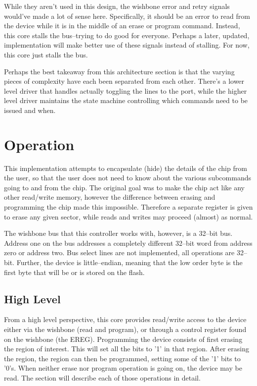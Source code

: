 \documentclass{gqtekspec}
\begin{document}
While they aren't used in this design, the wishbone error and retry signals
would've made a lot of sense here.  Specifically, it should be an error to
read from the device while it is in the middle of an erase or program command.
Instead, this core stalls the bus--trying to do good for everyone.  Perhaps
a later, updated, implementation will make better use of these signals instead
of stalling.  For now, this core just stalls the bus.

Perhaps the best takeaway from this architecture section is that the varying
pieces of complexity have each been separated from each other.  There's a
lower level driver that handles actually toggling the lines to the port,
while the higher level driver maintains the state machine controlling which
commands need to be issued and when.

\chapter{Operation}\label{chap:ops}
This implementation attempts to encapsulate (hide) the details of the chip
from the user, so that the user does not need to know about the various
subcommands going to and from the chip.  The original goal was to make the
chip act like any other read/write memory, however the difference between
erasing and programming the chip made this impossible.  Therefore a separate
register is given to erase any given sector, while reads and writes may proceed
(almost) as normal.

The wishbone bus that this controller works with, however, is a 32--bit
bus.  Address one on the bus addresses a completely different 32--bit word
from address zero or address two.  Bus select lines are not implemented,
all operations are 32--bit.  Further, the device is little--endian, meaning
that the low order byte is the first byte that will be or is stored on the
flash.

\section{High Level}
From a high level perspective, this core provides read/write access to the
device either via the wishbone (read and program), or through a control
register found on the wishbone (the EREG).  Programming the device consists of
first erasing the region of interest.  This will set all the bits to '1' in
that region.  After erasing the region, the region can then be programmed,
setting some of the '1' bits to '0's.  When neither erase nor program
operation is going on, the device may be read.  The section will describe
each of those operations in detail.
\end{document}
